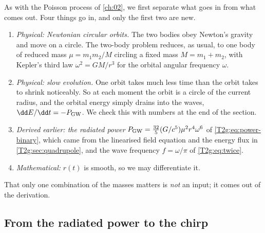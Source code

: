 As with the Poisson process of \cref{ch:02}, we first separate what goes in from what comes out. Four things go in, and only the first two are new.
\begin{enumerate}[itemsep=1pt]
  \item \emph{Physical: Newtonian circular orbits.} The two bodies obey Newton's gravity and move on a circle. The two-body problem reduces, as usual, to one body of reduced mass $\mu=m_1m_2/M$ circling a fixed mass $M=m_1+m_2$, with Kepler's third law $\omega^2=GM/r^3$ for the orbital angular frequency $\omega$.
  \item \emph{Physical: slow evolution.} One orbit takes much less time than the orbit takes to shrink noticeably. So at each moment the orbit is a circle of the current radius, and the orbital energy simply drains into the waves, $\dd E/\dd t=-P_{\rm GW}$. We check this with numbers at the end of the section.
  \item \emph{Derived earlier: the radiated power} $P_{\rm GW}=\tfrac{32}{5}(G/c^5)\mu^2r^4\omega^6$ of \eqref{T2g:eq:power-binary}, which came from the linearised field equation and the energy flux in \cref{T2g:sec:quadrupole}, and the wave frequency $f=\omega/\pi$ of \eqref{T2g:eq:twice}.
  \item \emph{Mathematical:} $r(t)$ is smooth, so we may differentiate it.
\end{enumerate}
That only one combination of the masses matters is \emph{not} an input; it comes out of the derivation.

\subsection{From the radiated power to the chirp}

